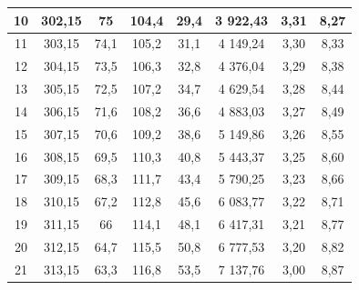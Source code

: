 \documentclass[a4paper,12pt]{article} %
\theoremstyle{plain} %
\theoremstyle{definition} %
\theoremstyle{remark} %
\begin{document}
\begin{table}[H]
\begin{center}
\begin{tabular}{|c|c|c|c|c|c|c|c|}
10         & 302,15        & 75                     & 104,4                  & 29,4                      & 3 922,43       & 3,31                                & 8,27         \\ \hline
11         & 303,15        & 74,1                   & 105,2                  & 31,1                      & 4 149,24       & 3,30                                & 8,33         \\ \hline
12         & 304,15        & 73,5                   & 106,3                  & 32,8                      & 4 376,04       & 3,29                                & 8,38         \\ \hline
13         & 305,15        & 72,5                   & 107,2                  & 34,7                      & 4 629,54       & 3,28                                & 8,44         \\ \hline
14         & 306,15        & 71,6                   & 108,2                  & 36,6                      & 4 883,03       & 3,27                                & 8,49         \\ \hline
15         & 307,15        & 70,6                   & 109,2                  & 38,6                      & 5 149,86       & 3,26                                & 8,55         \\ \hline
16         & 308,15        & 69,5                   & 110,3                  & 40,8                      & 5 443,37       & 3,25                                & 8,60         \\ \hline
17         & 309,15        & 68,3                   & 111,7                  & 43,4                      & 5 790,25       & 3,23                                & 8,66         \\ \hline
18         & 310,15        & 67,2                   & 112,8                  & 45,6                      & 6 083,77       & 3,22                                & 8,71         \\ \hline
19         & 311,15        & 66                     & 114,1                  & 48,1                      & 6 417,31       & 3,21                                & 8,77         \\ \hline
20         & 312,15        & 64,7                   & 115,5                  & 50,8                      & 6 777,53       & 3,20                                & 8,82         \\ \hline
21         & 313,15        & 63,3                   & 116,8                  & 53,5                      & 7 137,76       & 3,00                                & 8,87         \\ \hline
\end{tabular}
\end{center}
\end{table}
\end{document}
